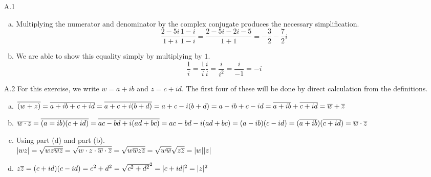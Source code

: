 \documentclass[../../Solutions.tex]{subfiles}
\begin{document}
\begin{itemize}
	\item [A.1]
		\begin{enumerate}[(a)]
			\item Multiplying the numerator and denominator by the complex conjugate produces the necessary simplification.
			$$ \frac{2-5i}{1+i}\frac{1-i}{1-i} = \frac{2-5i-2i-5}{1+1} = -\frac{3}{2}-\frac{7}{2}i $$
			
			\item We are able to show this equality simply by multiplying by $1$.
			$$ \frac{1}{i} = \frac{1}{i}\frac{i}{i} = \frac{i}{i^2} = \frac{i}{-1} = -i $$
		\end{enumerate}
		
	\item [A.2] For this exercise, we write $w = a+ib$ and $z = c+id$.
	The first four of these will be done by direct calculation from the definitions.
		\begin{enumerate}[(a)]
			\item $\overline{(w+z)} = \overline{a+ib+c+id} = \overline{a+c+i(b+d)} = a+c-i(b+d) = a-ib+c-id = \overline{a+ib}+\overline{c+id} = \overline{w}+\overline{z}$
			
			\item $\overline{w \cdot z} = \overline{(a=ib)(c+id)} = \overline{ac-bd+i(ad+bc)} = ac-bd-i(ad+bc) = (a-ib)(c-id) = (\overline{a+ib})(\overline{c+id}) = \overline{w} \cdot \overline{z}$
			
			\item Using part (d) and part (b). \\
			$|wz| = \sqrt{wz \overline{wz}} = \sqrt{w \cdot z \cdot \overline{w} \cdot \overline{z}} = \sqrt{w\overline{w}z\overline{z}} = \sqrt{w\overline{w}}\sqrt{z\overline{z}} = |w||z|$
			
			\item $z\overline{z} = (c+id)(c-id) = c^2+d^2 = \sqrt{c^2+d^2}^2 = |c+id|^2 = |z|^2$
			

\end{enumerate}
\end{itemize}
\end{document}
